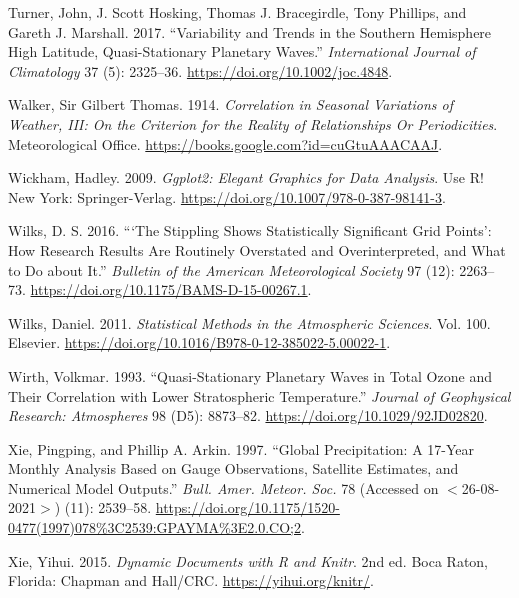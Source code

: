 \documentclass[smallextended]{svjour3}       %
\newlength{\cslhangindent}
\newlength{\cslentryspacingunit} %
\newenvironment{CSLReferences}[2] %
 {%
  \setlength{\parindent}{0pt}
  \ifodd #1
  \let\oldpar\par
  \def\par{\hangindent=\cslhangindent\oldpar}
  \fi
  \setlength{\parskip}{#2\cslentryspacingunit}
 }%
 {}
\begin{document}
\begin{CSLReferences}{1}{0}
\leavevmode{}%
Turner, John, J. Scott Hosking, Thomas J. Bracegirdle, Tony Phillips, and Gareth J. Marshall. 2017. {``Variability and Trends in the {Southern Hemisphere} High Latitude, Quasi-Stationary Planetary Waves.''} \emph{International Journal of Climatology} 37 (5): 2325--36. \url{https://doi.org/10.1002/joc.4848}.

\leavevmode{}%
Walker, Sir Gilbert Thomas. 1914. \emph{Correlation in {Seasonal Variations} of {Weather}, {III}: {On} the {Criterion} for the {Reality} of {Relationships Or Periodicities}}. {Meteorological Office}. \url{https://books.google.com?id=cuGtuAAACAAJ}.

\leavevmode{}%
Wickham, Hadley. 2009. \emph{Ggplot2: {Elegant Graphics} for {Data Analysis}}. Use {R}! {New York}: {Springer-Verlag}. \url{https://doi.org/10.1007/978-0-387-98141-3}.

\leavevmode{}%
Wilks, D. S. 2016. {``{`{The Stippling Shows Statistically Significant Grid Points}'}: {How Research Results} Are {Routinely Overstated} and {Overinterpreted}, and {What} to {Do} about {It}.''} \emph{Bulletin of the American Meteorological Society} 97 (12): 2263--73. \url{https://doi.org/10.1175/BAMS-D-15-00267.1}.

\leavevmode{}%
Wilks, Daniel. 2011. \emph{Statistical {Methods} in the {Atmospheric Sciences}}. Vol. 100. {Elsevier}. \url{https://doi.org/10.1016/B978-0-12-385022-5.00022-1}.

\leavevmode{}%
Wirth, Volkmar. 1993. {``Quasi-Stationary Planetary Waves in Total Ozone and Their Correlation with Lower Stratospheric Temperature.''} \emph{Journal of Geophysical Research: Atmospheres} 98 (D5): 8873--82. \url{https://doi.org/10.1029/92JD02820}.

\leavevmode{}%
Xie, Pingping, and Phillip A. Arkin. 1997. {``Global {Precipitation}: {A} 17-{Year Monthly Analysis Based} on {Gauge Observations}, {Satellite Estimates}, and {Numerical Model Outputs}.''} \emph{Bull. Amer. Meteor. Soc.} 78 (Accessed on {\(<\)}26-08-2021{\(>\)}) (11): 2539--58. \url{https://doi.org/10.1175/1520-0477(1997)078\%3C2539:GPAYMA\%3E2.0.CO;2}.

\leavevmode{}%
Xie, Yihui. 2015. \emph{Dynamic Documents with {R} and Knitr}. 2nd ed. {Boca Raton, Florida}: {Chapman and Hall/CRC}. \url{https://yihui.org/knitr/}.

\end{CSLReferences}




\end{document}
